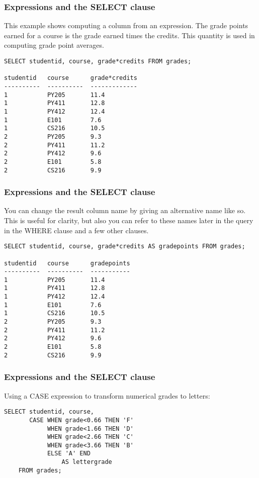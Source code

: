 \begin{frame}[fragile] \frametitle{Expressions and the SELECT clause}
This example shows computing a column from an expression. The grade points earned for a course is the grade earned times the credits. This quantity is used in computing grade point averages.
\begin{lstlisting}
SELECT studentid, course, grade*credits FROM grades;

studentid   course      grade*credits
----------  ----------  -------------
1           PY205       11.4         
1           PY411       12.8         
1           PY412       12.4         
1           E101        7.6          
1           CS216       10.5         
2           PY205       9.3          
2           PY411       11.2         
2           PY412       9.6          
2           E101        5.8          
2           CS216       9.9  
\end{lstlisting}
\end{frame}

\begin{frame}[fragile] \frametitle{Expressions and the SELECT clause}
You can change the result column name by giving an alternative name like so. This is useful for clarity, but also you can refer to these names later in the query in the WHERE clause and a few other clauses.
\begin{lstlisting}
SELECT studentid, course, grade*credits AS gradepoints FROM grades;

studentid   course      gradepoints
----------  ----------  -----------
1           PY205       11.4       
1           PY411       12.8       
1           PY412       12.4       
1           E101        7.6        
1           CS216       10.5       
2           PY205       9.3        
2           PY411       11.2       
2           PY412       9.6        
2           E101        5.8        
2           CS216       9.9   
\end{lstlisting}
\end{frame}

\begin{frame}[fragile] \frametitle{Expressions and the SELECT clause}
Using a CASE expression to transform numerical grades to letters:
\begin{lstlisting}
SELECT studentid, course,
       CASE WHEN grade<0.66 THEN 'F'
            WHEN grade<1.66 THEN 'D'
            WHEN grade<2.66 THEN 'C'
            WHEN grade<3.66 THEN 'B'
            ELSE 'A' END
                AS lettergrade
    FROM grades;
\end{lstlisting}
\end{frame}

